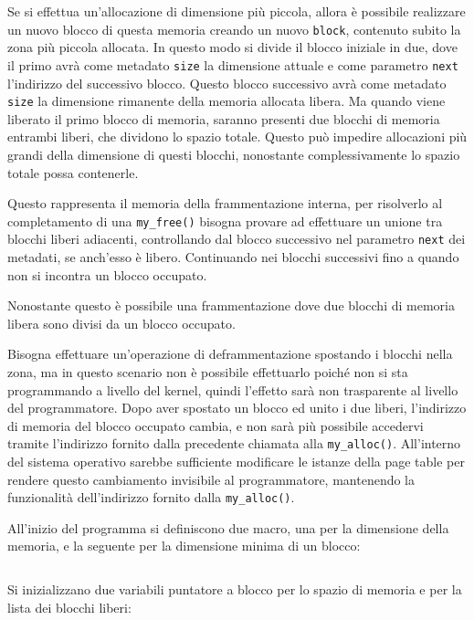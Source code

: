\documentclass{article}
\numberwithin{equation}{subsection}
\begin{document}
Se si effettua un'allocazione di dimensione più piccola, allora è possibile realizzare un nuovo 
blocco di questa memoria creando un nuovo \verb|block|, contenuto subito la zona più piccola 
allocata. In questo modo si divide il blocco iniziale in due, dove il primo avrà come metadato \verb|size| la dimensione attuale e come parametro \verb|next| l'indirizzo del successivo blocco. Questo blocco successivo avrà come metadato \verb|size| la dimensione rimanente della 
memoria allocata libera. 
Ma quando viene liberato il primo blocco di memoria, saranno presenti due blocchi di memoria 
entrambi liberi, che dividono lo spazio totale. Questo può impedire allocazioni più grandi della 
dimensione di questi blocchi, nonostante complessivamente lo spazio totale possa contenerle. 

Questo rappresenta il memoria della frammentazione interna, per risolverlo al completamento di 
una \verb|my_free()| bisogna provare ad effettuare un unione tra blocchi liberi adiacenti, controllando dal blocco successivo nel parametro \verb|next| dei metadati, se anch'esso è libero. Continuando nei blocchi successivi fino a quando non si incontra un blocco occupato. 

Nonostante questo è possibile una frammentazione dove due blocchi di memoria libera sono divisi 
da un blocco occupato. 

Bisogna effettuare un'operazione di deframmentazione spostando i blocchi nella zona, ma in questo 
scenario non è possibile effettuarlo poiché non si sta programmando a livello del kernel, quindi 
l'effetto sarà non trasparente al livello del programmatore. Dopo aver spostato un blocco 
ed unito i due liberi, l'indirizzo di memoria del blocco occupato cambia, e non sarà più possibile 
accedervi tramite l'indirizzo fornito dalla precedente chiamata alla \verb|my_alloc()|. All'interno del sistema operativo sarebbe sufficiente modificare le istanze della page table per 
rendere questo cambiamento invisibile al programmatore, mantenendo la funzionalità dell'indirizzo 
fornito dalla \verb|my_alloc()|. 


All'inizio del programma si definiscono due macro, una per la dimensione della memoria, e la seguente per la dimensione minima di un blocco: 
\inputminted[firstline=7,lastline=8]{c}{./Esercitazione del 19-11-24/domanda4.c}
Si inizializzano due variabili puntatore a blocco per lo spazio di memoria e per la lista 
dei blocchi liberi:
\inputminted[firstline=27,lastline=28]{c}{./Esercitazione del 19-11-24/domanda4.c}
\end{document}
